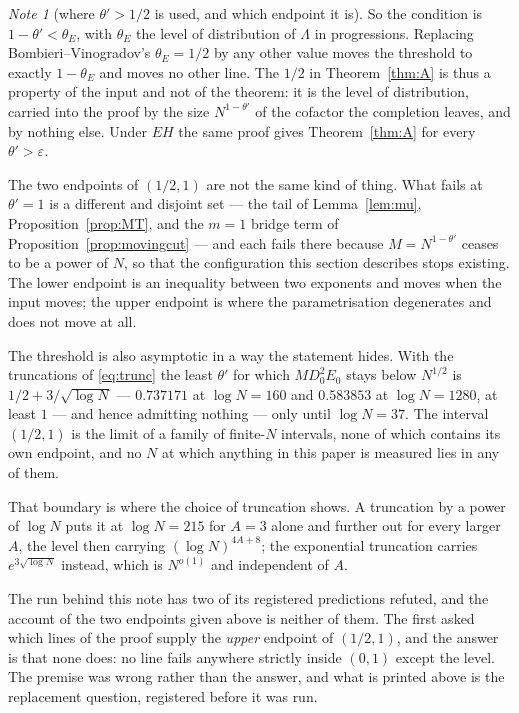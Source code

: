 \documentclass[11pt,a4paper]{article}
\theoremstyle{plain}
\theoremstyle{definition}
\theoremstyle{remark}
\newtheorem{note}[theorem]{Note}
\begin{document}
\begin{note}[where \texorpdfstring{$\theta'>1/2$}{the exponent
condition} is used, and which endpoint it
is]
So the condition is $1-\theta'<\theta_E$, with $\theta_E$ the level of
distribution of $\Lambda$ in progressions. Replacing
Bombieri--Vinogradov's $\theta_E=1/2$ by any other value moves the
threshold to exactly $1-\theta_E$ and moves no other line. The $1/2$
in Theorem~\ref{thm:A} is thus a property of the input and not of the
theorem: it is the level of distribution, carried into the proof by
the size $N^{1-\theta'}$ of the cofactor the completion leaves, and by
nothing else. Under $EH$ the same proof gives Theorem~\ref{thm:A} for
every $\theta'>\varepsilon$.

The two endpoints of $(1/2,1)$ are not the same kind of thing. What
fails at $\theta'=1$ is a different and disjoint set --- the tail of
Lemma~\ref{lem:mu}, Proposition~\ref{prop:MT}, and the $m=1$ bridge
term of Proposition~\ref{prop:movingcut} --- and each fails there
because $M=N^{1-\theta'}$ ceases to be a power of $N$, so that the
configuration this section describes stops existing. The lower
endpoint is an inequality between two exponents and moves when the
input moves; the upper endpoint is where the parametrisation
degenerates and does not move at all.

The threshold is also asymptotic in a way the statement hides. With
the truncations of \eqref{eq:trunc} the least $\theta'$ for which
$MD_0^2E_0$ stays below $N^{1/2}$ is $1/2+3/\sqrt{\log N}$ ---
$0.737171$ at $\log N=160$ and $0.583853$ at $\log N=1280$, at least
$1$ --- and hence admitting nothing --- only until $\log N=37$. The
interval $(1/2,1)$ is the limit of a family of finite-$N$ intervals,
none of
which contains its own endpoint, and no $N$ at which anything in this
paper is measured lies in any of them.

That boundary is where the choice of truncation shows. A truncation by
a power of $\log N$ puts it at $\log N=215$ for $A=3$ alone and further
out for every larger $A$, the level then carrying $(\log N)^{4A+8}$;
the exponential truncation carries $e^{3\sqrt{\log N}}$ instead, which
is $N^{o(1)}$ and independent of $A$.

The run behind this note has two of its registered predictions refuted,
and the account of the two endpoints given above is neither of them.
The first asked which lines of the proof supply
the \emph{upper} endpoint of $(1/2,1)$, and the answer is that none
does: no line fails anywhere strictly inside $(0,1)$ except the level.
The premise was wrong rather than the answer, and what is printed above
is the replacement question, registered before it was run.


\end{note}
\end{document}
